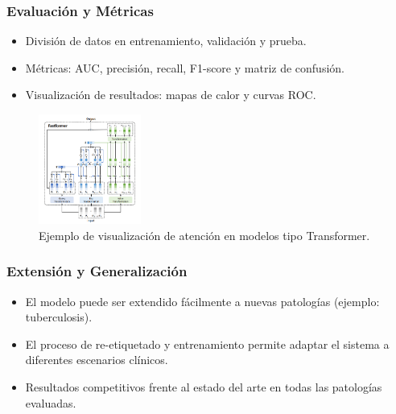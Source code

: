 \begin{frame}
\frametitle{Evaluación y Métricas}
\begin{itemize}
    \item División de datos en entrenamiento, validación y prueba.
    \item Métricas: AUC, precisión, recall, F1-score y matriz de confusión.
    \item Visualización de resultados: mapas de calor y curvas ROC.
\end{itemize}
\begin{figure}[ht!]
    \centering
    \includegraphics[width=0.3\textwidth]{../Chapters/2. Transformer/Figures/transformer/fastformer.png}
    \caption{Ejemplo de visualización de atención en modelos tipo Transformer.}
\end{figure}
\end{frame}

\begin{frame}
\frametitle{Extensión y Generalización}
\begin{itemize}
    \item El modelo puede ser extendido fácilmente a nuevas patologías (ejemplo: tuberculosis).
    \item El proceso de re-etiquetado y entrenamiento permite adaptar el sistema a diferentes escenarios clínicos.
    \item Resultados competitivos frente al estado del arte en todas las patologías evaluadas.
\end{itemize}
\end{frame}
